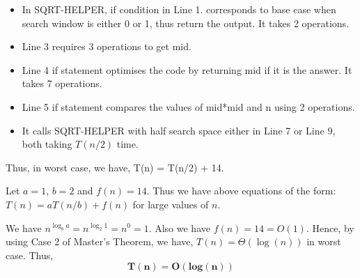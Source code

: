 \documentclass[11pt]{article}
\begin{document}
\begin{itemize}
    \item In SQRT-HELPER, if condition in Line 1. corresponds to base case when search window is either 0 or 1, thus return the output. It takes 2 operations.
    \item Line 3 requires 3 operations to get mid.
    \item Line 4 if statement optimises the code by returning mid if it is the answer. It takes 7 operations.
    \item Line 5 if statement compares the values of mid*mid and n using 2 operations.
    \item It calls SQRT-HELPER with half search space either in Line 7 or Line 9, both taking $T(n/2)$ time.
\end{itemize}

Thus, in worst case, we have, T(n) = T(n/2) + 14.

Let $a = 1$, $b=2$ and $f(n) = 14$. Thus we have above equations of the form:
$T(n) = aT(n/b) + f(n)$ for large values of $n$.

We have $n^{\log_b a} = n^{\log_{2} 1} = n^0 = 1$. Also we have $f(n) = 14 = O(1)$. Hence, by using Case 2 of Master's Theorem, we have, $T(n) = \Theta(\log(n))$ in worst case. Thus, 
$$\mathbf{T(n) = O(log(n))}$$
\end{document}
